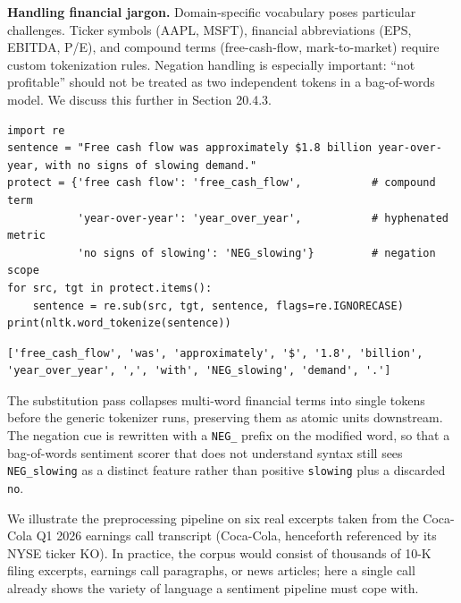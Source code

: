\textbf{Handling financial jargon.} Domain-specific vocabulary poses particular challenges. Ticker symbols (AAPL, MSFT), financial abbreviations (EPS, EBITDA, P/E), and compound terms (free-cash-flow, mark-to-market) require custom tokenization rules. Negation handling is especially important: ``not profitable'' should not be treated as two independent tokens in a bag-of-words model. We discuss this further in Section 20.4.3.

\begin{verbatim}
import re
sentence = "Free cash flow was approximately $1.8 billion year-over-year, with no signs of slowing demand."
protect = {'free cash flow': 'free_cash_flow',           # compound term
           'year-over-year': 'year_over_year',           # hyphenated metric
           'no signs of slowing': 'NEG_slowing'}         # negation scope
for src, tgt in protect.items():
    sentence = re.sub(src, tgt, sentence, flags=re.IGNORECASE)
print(nltk.word_tokenize(sentence))
\end{verbatim}

\begin{verbatim}
['free_cash_flow', 'was', 'approximately', '$', '1.8', 'billion', 'year_over_year', ',', 'with', 'NEG_slowing', 'demand', '.']
\end{verbatim}

The substitution pass collapses multi-word financial terms into single tokens before the generic tokenizer runs, preserving them as atomic units downstream. The negation cue is rewritten with a \texttt{NEG\_} prefix on the modified word, so that a bag-of-words sentiment scorer that does not understand syntax still sees \texttt{NEG\_slowing} as a distinct feature rather than positive \texttt{slowing} plus a discarded \texttt{no}.

We illustrate the preprocessing pipeline on six real excerpts taken from the Coca-Cola Q1 2026 earnings call transcript (Coca-Cola, henceforth referenced by its NYSE ticker KO). In practice, the corpus would consist of thousands of 10-K filing excerpts, earnings call paragraphs, or news articles; here a single call already shows the variety of language a sentiment pipeline must cope with.

